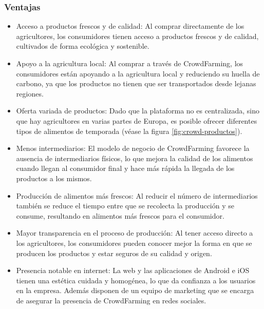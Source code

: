 
\subsubsection{Ventajas}

\begin{itemize}

	\item Acceso a productos frescos y de calidad: Al comprar directamente de los agricultores, los consumidores tienen acceso a productos frescos y de calidad, cultivados de forma ecológica y sostenible.

	\item Apoyo a la agricultura local: Al comprar a través de CrowdFarming, los consumidores están apoyando a la agricultura local y reduciendo su huella de carbono, ya que los productos no tienen que ser transportados desde lejanas regiones.

	\item Oferta variada de productos: Dado que la plataforma no es centralizada, sino que hay agricultores en varias partes de Europa, es posible ofrecer diferentes tipos de alimentos de temporada (véase la figura \ref{fig:crowd-productos}).

	\item Menos intermediarios: El modelo de negocio de CrowdFarming favorece la ausencia de intermediarios físicos, lo que mejora la calidad de los alimentos cuando llegan al consumidor final y hace más rápida la llegada de los productos a los mismos.

	\item Producción de alimentos más frescos: Al reducir el número de intermediarios también se reduce el tiempo entre que se recolecta la producción y se consume, resultando en alimentos más frescos para el consumidor.

	\item Mayor transparencia en el proceso de producción: Al tener acceso directo a los agricultores, los consumidores pueden conocer mejor la forma en que se producen los productos y estar seguros de su calidad y origen.

	\item Presencia notable en internet: La web y las aplicaciones de Android e iOS tienen una estética cuidada y homogénea, lo que da confianza a los usuarios en la empresa. Además disponen de un equipo de marketing que se encarga de asegurar la presencia de CrowdFarming en redes sociales.

\end{itemize}

